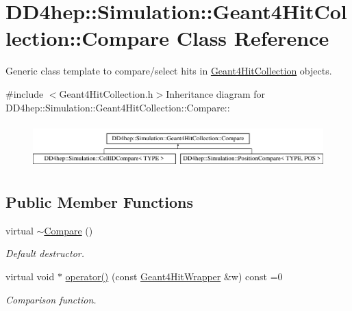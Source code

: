 \hypertarget{class_d_d4hep_1_1_simulation_1_1_geant4_hit_collection_1_1_compare}{
\section{DD4hep::Simulation::Geant4HitCollection::Compare Class Reference}
\label{class_d_d4hep_1_1_simulation_1_1_geant4_hit_collection_1_1_compare}
}


Generic class template to compare/select hits in \hyperlink{class_d_d4hep_1_1_simulation_1_1_geant4_hit_collection}{Geant4HitCollection} objects.  


{\ttfamily \#include $<$Geant4HitCollection.h$>$}Inheritance diagram for DD4hep::Simulation::Geant4HitCollection::Compare::\begin{figure}[H]
\begin{center}
\leavevmode
\includegraphics[height=1.74455cm]{class_d_d4hep_1_1_simulation_1_1_geant4_hit_collection_1_1_compare}
\end{center}
\end{figure}
\subsection*{Public Member Functions}
\begin{DoxyCompactItemize}
\item 
virtual \hyperlink{class_d_d4hep_1_1_simulation_1_1_geant4_hit_collection_1_1_compare_a564c52106afdec9d7721a4089ada4fb9}{$\sim$Compare} ()
\begin{DoxyCompactList}\small\item\em Default destructor. \item\end{DoxyCompactList}\item 
virtual void $\ast$ \hyperlink{class_d_d4hep_1_1_simulation_1_1_geant4_hit_collection_1_1_compare_ad81521e6dfc48aaee6d2dd9464a7afeb}{operator()} (const \hyperlink{class_d_d4hep_1_1_simulation_1_1_geant4_hit_wrapper}{Geant4HitWrapper} \&w) const =0
\begin{DoxyCompactList}\small\item\em Comparison function. \item\end{DoxyCompactList}\end{DoxyCompactItemize}


